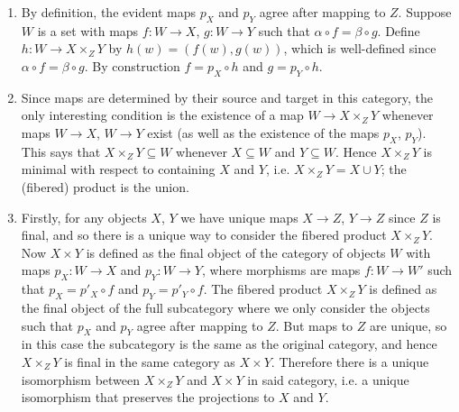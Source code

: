 \documentclass{report}
\begin{document}
\begin{enumerate}[label=\textbf{1.3.\Alph*.}]
	\item By definition, the evident maps $p_X$ and $p_Y$ agree after
	      mapping to $Z$. Suppose $W$ is a set with maps $f:W\to X$, $g:W\to Y$
	      such that $\alpha\circ f=\beta\circ g$. Define $h:W\to X\times_ZY$
	      by $h(w) = (f(w), g(w))$, which is well-defined since
	      $\alpha\circ f=\beta\circ g$. By construction $f=p_X\circ h$ and
	      $g=p_Y\circ h$.

	\item Since maps are determined by their source and target in this
	      category, the only interesting condition is the existence of a map
	      $W\to X\times_ZY$ whenever maps $W\to X$, $W\to Y$ exist (as well as
	      the existence of the maps $p_X$, $p_Y$). This says that
	      $X\times_ZY\subseteq W$ whenever $X\subseteq W$ and $Y\subseteq W$.
	      Hence $X\times_ZY$ is minimal with respect to containing $X$ and $Y$,
	      i.e. $X\times_ZY=X\cup Y$; the (fibered) product is the union.

	\item Firstly, for any objects $X$, $Y$ we have unique maps $X\to Z$,
	      $Y\to Z$ since $Z$ is final, and so there is a unique way to consider
	      the fibered product $X\times_ZY$. Now $X\times Y$ is defined as the
	      final object of the category of objects $W$ with maps $p_X:W\to X$
	      and $p_Y:W\to Y$, where morphisms are maps $f:W\to W'$ such that
	      $p_X=p'_X\circ f$ and $p_Y=p'_Y\circ f$. The fibered product
	      $X\times_ZY$ is defined as the final object of the full subcategory
	      where we only consider the objects such that $p_X$ and $p_Y$ agree
	      after mapping to $Z$. But maps to $Z$ are unique, so in this case the
	      subcategory is the same as the original category, and hence
	      $X\times_ZY$ is final in the same category as $X\times Y$.
	      Therefore there is a unique isomorphism between $X\times_ZY$ and
	      $X\times Y$ in said category, i.e. a unique isomorphism that
	      preserves the projections to $X$ and $Y$.


\end{enumerate}
\end{document}
